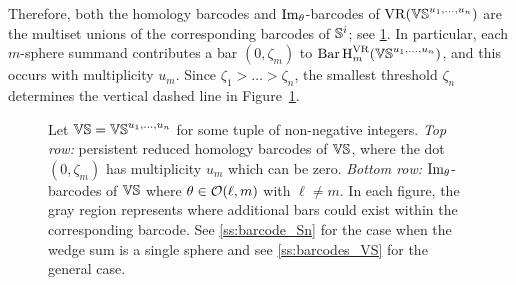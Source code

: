 Therefore, both the homology barcodes and \(\img_\theta\)-barcodes of \(\VR(\VS^{u_1, \dots, u_n})\) are the multiset unions of the corresponding barcodes of \(\bS^i\); see \cref{fig:barcodes_vs}.
In particular, each $m$-sphere summand contributes a bar $(0,\zeta_m)$
to $\Hbarc[\field]{m}{\VS^{u_1,\dots,u_n}}$,
and this occurs with multiplicity $u_m$.
Since $\zeta_1 > \dots > \zeta_n$,
the smallest threshold $\zeta_n$ determines the vertical dashed line
in Figure~\ref{fig:barcodes_vs}.

\begin{figure}
	\centering
	
	\caption{Let $\VS = \VS^{u_1,\dots,u_n}$ for some tuple of non-negative integers.
		\emph{Top row:} persistent reduced homology barcodes of $\VS$, where the dot $(0,\zeta_m)$ has multiplicity $u_m$ which can be zero.
		\emph{Bottom row:} $\img_\theta$-barcodes of $\VS$ where $\theta \in \cO(\ell,m)$ with \(\ell \neq m\).
		In each figure, the gray region represents where additional bars could exist within the corresponding barcode.
		See \cref{ss:barcode_Sn} for the case when the wedge sum is a single sphere and see \cref{ss:barcodes_VS} for the general case.}
	\label{fig:barcodes_vs}
\end{figure}
